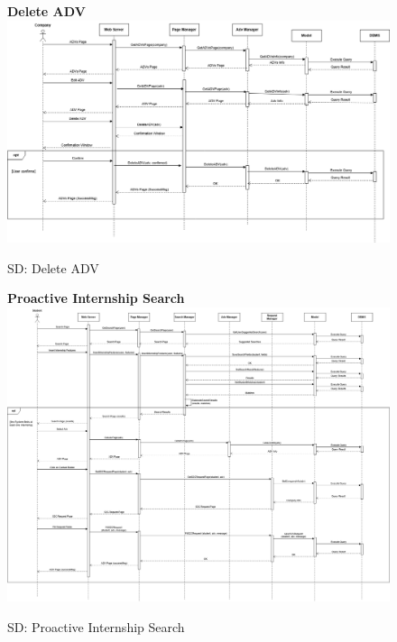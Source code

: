 \begin{figure}[H]
\textbf{Delete ADV}\newline\newline
\includegraphics[width=15cm]{images/architectural design/runtime/DD-UC10.drawio (1).png}
    \caption{SD: Delete ADV}
\end{figure}

\begin{figure}[H]
\textbf{Proactive Internship Search}\newline\newline
\includegraphics[width=15cm]{images/architectural design/runtime/DD-UC11.drawio.png}
    \caption{SD: Proactive Internship Search}
\end{figure}

